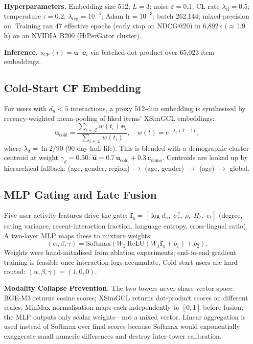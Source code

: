 \documentclass[conference]{IEEEtran}
\begin{document}
\textbf{Hyperparameters.}
Embedding size 512; $L=3$; noise $\varepsilon=0.1$; CL rate
$\lambda_\text{cl}=0.5$; temperature $\tau=0.2$;
$\lambda_\text{reg}=10^{-4}$; Adam lr$=10^{-3}$; batch 262,144;
mixed-precision on.
Training ran 47 effective epochs (early stop on NDCG@20) in
6,892\,s ($\approx$1.9\,h) on an NVIDIA B200 (HiPerGator cluster).

\textbf{Inference.}
$s_\text{CF}(i) = \mathbf{u}^\top\mathbf{e}_i$ via batched dot product
over 65,023 item embeddings.

\subsection{Cold-Start CF Embedding}

For users with $d_u<5$ interactions, a proxy 512-dim embedding is
synthesised by recency-weighted mean-pooling of liked items' XSimGCL
embeddings:
\begin{equation}
  \mathbf{u}_\text{cold} =
    \frac{\sum_{i\in\mathcal{L}} w(t_i)\,\mathbf{e}_i}
         {\sum_{i\in\mathcal{L}} w(t_i)},\quad
  w(t)=e^{-\lambda_d(T-t)},
\end{equation}
where $\lambda_d=\ln2/90$ (90-day half-life).
This is blended with a demographic cluster centroid at weight
$\gamma_d=0.30$:
$\hat{\mathbf{u}} = 0.7\,\mathbf{u}_\text{cold} + 0.3\,\mathbf{c}_\text{demo}$.
Centroids are looked up by hierarchical fallback:
(age, gender, region) $\to$ (age, gender) $\to$ (age) $\to$ global.

\subsection{MLP Gating and Late Fusion}

Five user-activity features drive the gate:
$\mathbf{f}_u = [\log d_u,\;\sigma^2_r,\;\rho,\;H_\ell,\;c_\ell]$
(degree, rating variance, recent-interaction fraction, language
entropy, cross-lingual ratio).
A two-layer MLP maps these to mixture weights:
\begin{equation}
  (\alpha,\beta,\gamma) =
  \mathrm{Softmax}(W_2\,\mathrm{ReLU}(W_1\mathbf{f}_u+b_1)+b_2).
  \label{eq:gate}
\end{equation}
Weights were hand-initialised from ablation experiments; end-to-end
gradient training is feasible once interaction logs accumulate.
Cold-start users are hard-routed: $(\alpha,\beta,\gamma)=(1,0,0)$.

\textbf{Modality Collapse Prevention.}
The two towers never share vector space.
BGE-M3 returns cosine scores; XSimGCL returns dot-product scores on
different scales.
MinMax normalisation maps each independently to $[0,1]$ before fusion;
the MLP outputs only scalar weights---not a mixed vector.
Linear aggregation is used instead of Softmax over final scores because
Softmax would exponentially exaggerate small numeric differences and
destroy inter-tower calibration.
\end{document}
